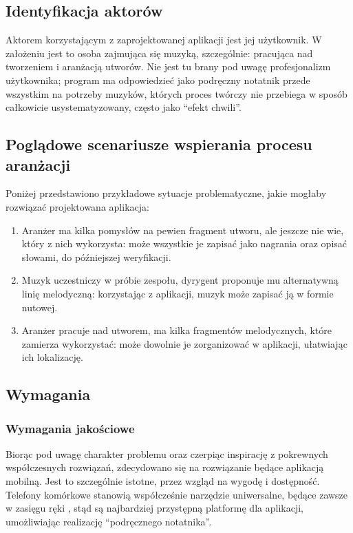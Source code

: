 \subsection{Identyfikacja aktorów}
Aktorem korzystającym z zaprojektowanej aplikacji jest jej użytkownik.
W założeniu jest to osoba zajmująca się muzyką, szczególnie: pracująca nad tworzeniem i aranżacją utworów.
Nie jest tu brany pod uwagę profesjonalizm użytkownika; program ma odpowiedzieć jako podręczny notatnik przede wszystkim
na potrzeby muzyków, których proces twórczy nie przebiega w sposób całkowicie usystematyzowany, często jako \enquote{efekt chwili}.

\subsection{Poglądowe scenariusze wspierania procesu aranżacji}
Poniżej przedstawiono przykładowe sytuacje problematyczne, jakie mogłaby rozwiązać projektowana aplikacja:
\begin{enumerate}
	\item Aranżer ma kilka pomysłów na pewien fragment utworu, ale jeszcze nie wie, który z nich wykorzysta:
	      może wszystkie je zapisać jako nagrania oraz opisać słowami, do późniejszej weryfikacji.
	\item Muzyk uczestniczy w próbie zespołu, dyrygent proponuje mu alternatywną linię melodyczną:
	      korzystając z aplikacji, muzyk może zapisać ją w formie nutowej.
	\item Aranżer pracuje nad utworem, ma kilka fragmentów melodycznych, które zamierza wykorzystać:
	      może dowolnie je zorganizować w aplikacji, ułatwiając ich lokalizację.
\end{enumerate}

\subsection{Wymagania}
\subsubsection{Wymagania jakościowe}
Biorąc pod uwagę charakter problemu oraz czerpiąc inspirację z pokrewnych współczesnych rozwiązań,
zdecydowano się na rozwiązanie będące aplikacją mobilną.
Jest to szczególnie istotne, przez wzgląd na wygodę i dostępność.
Telefony komórkowe stanowią współcześnie narzędzie uniwersalne, będące zawsze w zasięgu ręki \cite{10},
stąd są najbardziej przystępną platformę dla aplikacji, umożliwiając realizację \enquote{podręcznego notatnika}.

